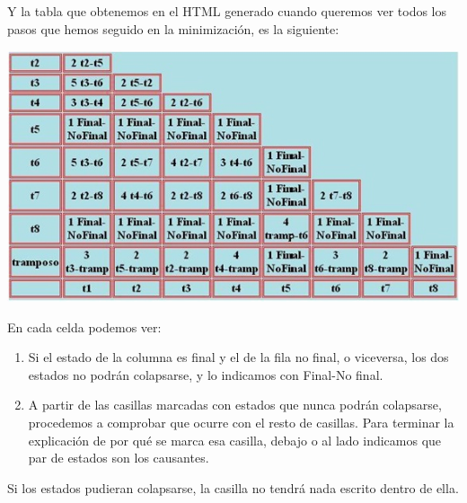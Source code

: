 \documentclass[12pt,a4paper,spanish]{book}
\begin{document}
Y la tabla que obtenemos en el HTML generado cuando queremos ver todos los pasos que hemos seguido en la minimizaci\'on, es la siguiente:
\newline 
\begin{center}
\includegraphics[width=\textwidth]{tabla1.jpg}\\
\end{center}


En cada celda podemos ver:
\begin{enumerate}
\item Si el estado de la columna es final y el de la fila no final, o viceversa, los dos estados no podr\'an colapsarse, y lo indicamos con Final-No final.
\item A partir de las casillas marcadas con estados que nunca podr\'an colapsarse, procedemos a comprobar que ocurre con el resto de casillas. Para terminar la explicaci\'on de por qu\'e se marca esa casilla, debajo o al lado indicamos que par de estados son los causantes.
\end{enumerate}

Si los estados pudieran colapsarse, la casilla no tendr\'a nada escrito dentro de ella.\\
\end{document}
